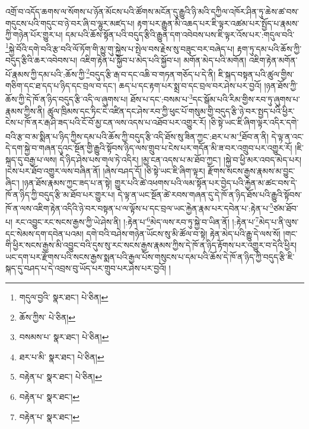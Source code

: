 འགྲོ་བ་འདོད་ཆགས་ལ་སོགས་པ་ཉོན་མོངས་པའི་ཚོགས་མངོན་དུ་རྒྱུའི་ཉི་མའི་དཀྱིལ་འཁོར་ཤིན་ཏུ་ཆེས་ཚ་བས་གདུངས་པའི་གདུང་བ་ཉེ་བར་ཞི་བ་ལྷུར་མཛད་པ། རྟག་པར་རྒྱུན་མི་འཆད་པར་ཇི་ལྟར་འཚམ་པར་སྤྱོད་པ་རྣམས་ཀྱི་གཉེན་པོར་གྱུར་པ། དམ་པའི་ཆོས་སྟོན་པའི་བདུད་རྩིའི་རྒྱུན་དག་འབེབས་པས་ཇི་ལྟར་འོས་པར་:གདུལ་བའི་\footnote{གདུལ་བྱའི་  སྣར་ཐང་།  པེ་ཅིན། }སྐྱེ་བོའི་དགེ་བའི་རྩ་བའི་ལོ་ཏོག་གི་མྱུ་གུ་སྐྱེས་པ་སྤེལ་བས་རྗེས་སུ་བཟུང་བར་བཞེད་པ། རྟག་ཏུ་དམ་པའི་ཆོས་ཀྱི་བདུད་རྩིའི་ཆར་འབེབས་པ། འཇིག་རྟེན་པ་སྐྱོབ་པ་མེད་པའི་སྐྱོབ་པ། མགོན་མེད་པའི་མགོན། འཇིག་རྟེན་མགོན་པོ་རྣམས་ཀྱི་དམ་པའི་:ཆོས་ཀྱི་\footnote{ཆོས་ཀྱིས་  པེ་ཅིན། }བདུད་རྩི་རྒ་བ་དང་འཆི་བ་གཏན་གཅོད་པ་དེ་ནི། ཇི་སྐད་བསྟན་པའི་ཚུལ་གྱིས་གཅིག་དང་ཐ་དད་པ་ཉིད་དང་བྲལ་བ་དང་། ཆད་པ་དང་རྟག་པར་སྨྲ་བ་དང་བྲལ་བར་ཤེས་པར་བྱའོ། །ཉན་ཐོས་ཀྱི་ཆོས་ཀྱི་དེ་ཁོ་ན་ཉིད་བདུད་རྩི་འདི་ལ་ཞུགས་པ། ཐོས་པ་དང་:བསམ་པ་\footnote{བསམས་པ་  སྣར་ཐང་།  པེ་ཅིན། }དང་སྒོམ་པའི་རིམ་གྱིས་རབ་ཏུ་ཞུགས་པ་རྣམས་ཀྱིས་ནི། ཚུལ་ཁྲིམས་དང་ཏིང་ངེ་འཛིན་དང་ཤེས་རབ་ཀྱི་ཕུང་པོ་གསུམ་གྱི་བདུད་རྩི་ཉེ་བར་སྤྱད་པའི་ཕྱིར་ངེས་པ་ཁོ་ནར་རྒ་ཤི་ཟད་པའི་ངོ་བོ་མྱ་ངན་ལས་འདས་པ་འཐོབ་པར་འགྱུར་རོ། །ཅི་སྟེ་ཡང་ཇི་ཞིག་ལྟར་འདིར་དགེ་བའི་རྩ་བ་མ་སྨིན་པ་ཉིད་ཀྱིས་དམ་པའི་ཆོས་ཀྱི་བདུད་རྩི་འདི་ཐོས་སུ་ཟིན་ཀྱང་:ཐར་པ་མ་\footnote{ཐར་པ་མི་  སྣར་ཐང་།  པེ་ཅིན། }ཐོབ་ན་ནི། དེ་ལྟ་ན་འང་དེ་དག་སྐྱེ་བ་གཞན་དུའང་སྔོན་གྱི་རྒྱུའི་སྟོབས་ཉིད་ལས་གྲུབ་པ་ངེས་པར་གདོན་མི་ཟ་བར་འགྲུབ་པར་འགྱུར་རོ། །ཇི་སྐད་དུ་བརྒྱ་པ་ལས། དེ་ཉིད་ཤེས་པས་གལ་ཏེ་འདིར། །མྱ་ངན་འདས་པ་མ་ཐོབ་ཀྱང་། །སྐྱེ་བ་ཕྱི་མར་འབད་མེད་པར། །ངེས་པར་ཐོབ་འགྱུར་ལས་བཞིན་ནོ། །ཞེས་བཤད་དོ། །ཅི་སྟེ་ཡང་ཇི་ཞིག་ལྟར། རྫོགས་སངས་རྒྱས་རྣམས་མ་བྱུང་ཞིང་། །ཉན་ཐོས་རྣམས་ཀྱང་ཟད་པ་ན་སྟེ། གྱུར་པའི་ཚེ་འཕགས་པའི་ལམ་སྟོན་པར་བྱེད་པའི་རྐྱེན་མ་ཚང་བས་དེ་ཁོ་ན་ཉིད་ཀྱི་བདུད་རྩི་མ་ཐོབ་པར་གྱུར་པ། དེ་ལྟ་ན་ཡང་སྔོན་ཚེ་རབས་གཞན་དུ་དེ་ཁོ་ན་ཉིད་ཐོས་པའི་རྒྱུའི་སྟོབས་ཁོ་ན་ལས་འཇིག་རྟེན་འདིའི་ཉེ་བར་བསྟན་པ་ལ་ལྟོས་པ་དང་བྲལ་ཡང་རྐྱེན་རྣམ་པར་དབེན་པ་:རྟེན་པ་\footnote{བརྟེན་པ་  སྣར་ཐང་།  པེ་ཅིན། }ཙམ་ཐོབ་པ། རང་འབྱུང་རང་སངས་རྒྱས་ཀྱི་ཡེ་ཤེས་ནི། །:རྟེན་པ་\footnote{བརྟེན་པ་  སྣར་ཐང་། }མེད་ལས་རབ་ཏུ་སྐྱེ་བ་ཡིན་ནོ། །:རྟེན་པ་\footnote{བརྟེན་པ་  སྣར་ཐང་། }མེད་པ་ནི་ལུས་དང་སེམས་དག་དབེན་པའམ། དགེ་བའི་བཤེས་གཉེན་ཡོངས་སུ་མི་ཚོལ་བ་སྟེ། རྟེན་མེད་པའི་རྒྱུ་དེ་ལས་སོ། །གང་གི་ཕྱིར་སངས་རྒྱས་མི་འབྱུང་བའི་དུས་སུ་རང་སངས་རྒྱས་རྣམས་ཀྱིས་དེ་ཁོ་ན་ཉིད་རྟོགས་པར་འགྱུར་བ་དེའི་ཕྱིར། ཡང་དག་པར་རྫོགས་པའི་སངས་རྒྱས་སྨན་པའི་རྒྱལ་པོས་གསུངས་པ་དམ་པའི་ཆོས་དེ་ཁོ་ན་ཉིད་ཀྱི་བདུད་རྩི་ཇི་སྐད་དུ་བཤད་པ་དེ་འབྲས་བུ་ཡོད་པར་གྲུབ་པར་ཤེས་པར་བྱའོ། །
